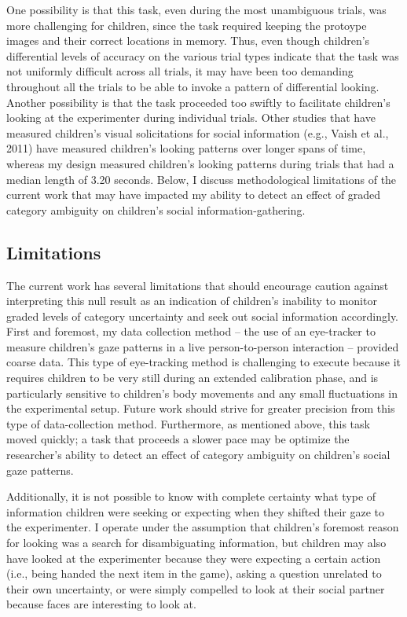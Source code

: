 \documentclass[floatsintext,man]{apa6}
\theoremstyle{definition}
\theoremstyle{definition}
\theoremstyle{definition}
\theoremstyle{remark}
\begin{document}
One possibility is that this task, even during the most unambiguous
trials, was more challenging for children, since the task required
keeping the protoype images and their correct locations in memory. Thus,
even though children's differential levels of accuracy on the various
trial types indicate that the task was not uniformly difficult across
all trials, it may have been too demanding throughout all the trials to
be able to invoke a pattern of differential looking. Another possibility
is that the task proceeded too swiftly to facilitate children's looking
at the experimenter during individual trials. Other studies that have
measured children's visual solicitations for social information (e.g.,
Vaish et al., 2011) have measured children's looking patterns over
longer spans of time, whereas my design measured children's looking
patterns during trials that had a median length of 3.20 seconds. Below,
I discuss methodological limitations of the current work that may have
impacted my ability to detect an effect of graded category ambiguity on
children's social information-gathering.

\subsection{Limitations}\label{limitations}

The current work has several limitations that should encourage caution
against interpreting this null result as an indication of children's
inability to monitor graded levels of category uncertainty and seek out
social information accordingly. First and foremost, my data collection
method -- the use of an eye-tracker to measure children's gaze patterns
in a live person-to-person interaction -- provided coarse data. This
type of eye-tracking method is challenging to execute because it
requires children to be very still during an extended calibration phase,
and is particularly sensitive to children's body movements and any small
fluctuations in the experimental setup. Future work should strive for
greater precision from this type of data-collection method. Furthermore,
as mentioned above, this task moved quickly; a task that proceeds a
slower pace may be optimize the researcher's ability to detect an effect
of category ambiguity on children's social gaze patterns.

Additionally, it is not possible to know with complete certainty what
type of information children were seeking or expecting when they shifted
their gaze to the experimenter. I operate under the assumption that
children's foremost reason for looking was a search for disambiguating
information, but children may also have looked at the experimenter
because they were expecting a certain action (i.e., being handed the
next item in the game), asking a question unrelated to their own
uncertainty, or were simply compelled to look at their social partner
because faces are interesting to look at.
\end{document}
